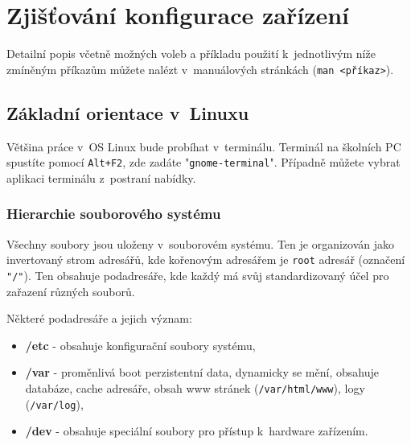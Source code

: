 
\section{Zjišťování konfigurace zařízení}
Detailní popis včetně možných voleb a příkladu použití k~jednotlivým níže zmíněným příkazům můžete nalézt v~manuálových stránkách (\texttt{man <příkaz>}).
\subsection{Základní orientace v~Linuxu}
Většina práce v~OS Linux bude probíhat v~terminálu. Terminál na školních PC spustíte pomocí \texttt{Alt+F2}, zde zadáte "\texttt{gnome-terminal}". Případně můžete vybrat aplikaci terminálu z~postraní nabídky.
\subsubsection{Hierarchie souborového systému}
Všechny soubory jsou uloženy v~souborovém systému. Ten je organizován jako invertovaný strom adresářů,
kde kořenovým adresářem je \texttt{root} adresář (označení \texttt{"/"}). Ten obsahuje podadresáře,
kde každý má svůj standardizovaný účel pro zařazení různých souborů.

Některé podadresáře a jejich význam:
\begin{itemize}
				\item \textbf{/etc} - obsahuje konfigurační soubory systému,
				\item \textbf{/var} - proměnlivá boot perzistentní data, dynamicky se mění, obsahuje databáze, cache adresáře, obsah www stránek (\texttt{/var/html/www}), logy (\texttt{/var/log}),
				\item \textbf{/dev} - obsahuje speciální soubory pro přístup k~hardware zařízením.
\end{itemize}

